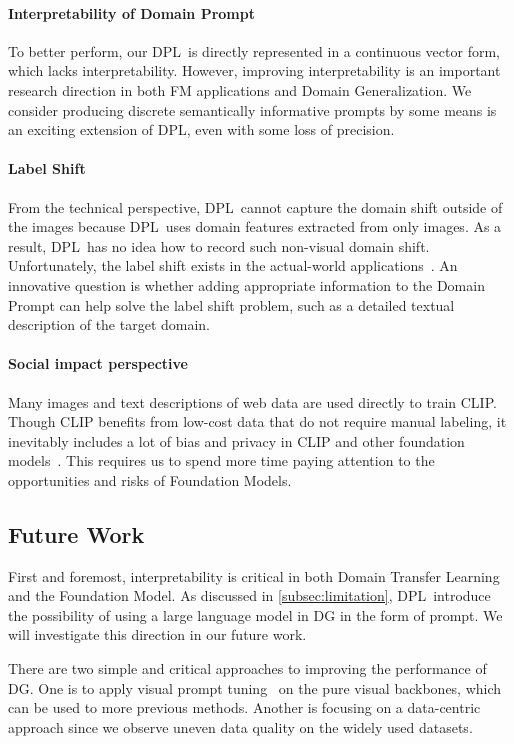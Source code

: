 \documentclass[letterpaper]{article} \usepackage[]{aaai23}
\newcommand{\dplshort}{DPL}
\begin{document}
\paragraph{Interpretability of Domain Prompt} To better perform, our \dplshort~is directly represented in a continuous vector form, which lacks interpretability. 
However, improving interpretability is an important research direction in both FM applications and Domain Generalization.
We consider producing discrete semantically informative prompts by some means is an exciting extension of \dplshort, even with some loss of precision.

\paragraph{Label Shift} From the technical perspective, \dplshort~cannot capture the domain shift outside of the images because \dplshort~uses domain features extracted from only images.
As a result, \dplshort~has no idea how to record such non-visual domain shift.
Unfortunately, the label shift exists in the actual-world applications~\cite{azizzadenesheli2019regularized}.
An innovative question is whether adding appropriate information to the Domain Prompt can help solve the label shift problem, such as a detailed textual description of the target domain.

\paragraph{Social impact perspective}
Many images and text descriptions of web data are used directly to train CLIP. 
Though CLIP benefits from low-cost data that do not require manual labeling, it inevitably includes a lot of bias and privacy in CLIP and other foundation models~\cite{bommasani2021opportunities}.
This requires us to spend more time paying attention to the opportunities and risks of Foundation Models.

\subsection{Future Work}
First and foremost, interpretability is critical in both Domain Transfer Learning and the Foundation Model. 
As discussed in \autoref{subsec:limitation}, \dplshort~introduce the possibility of using a large language model in DG in the form of prompt.
We will investigate this direction in our future work.

There are two simple and critical approaches to improving the performance of DG. 
One is to apply visual prompt tuning~\cite{jia2022visual} on the pure visual backbones, which can be used to more previous methods.
Another is focusing on a data-centric approach since we observe uneven data quality on the widely used datasets.
\end{document}
